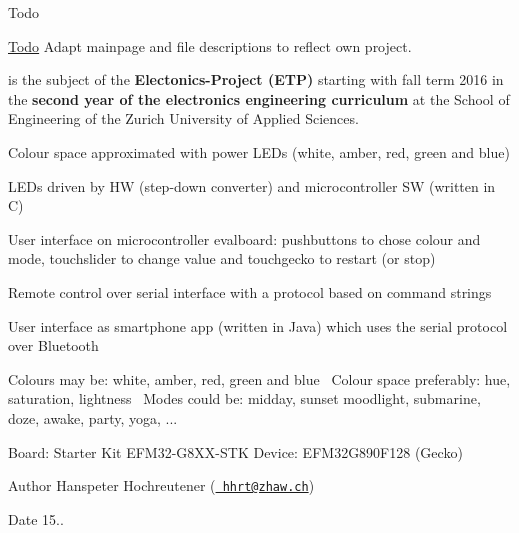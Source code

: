 

\begin{DoxyRefDesc}{Todo}
\item[\mbox{\hyperlink{todo__todo000001}{Todo}}]Adapt mainpage and file descriptions to reflect own project.\end{DoxyRefDesc}


is the subject of the {\bfseries{Electonics-\/\+Project (E\+TP)}} starting with fall term 2016 in the {\bfseries{second year of the electronics engineering curriculum}} at the School of Engineering of the Zurich University of Applied Sciences.

Colour space approximated with power L\+E\+Ds (white, amber, red, green and blue) 

L\+E\+Ds driven by HW (step-\/down converter) and microcontroller SW (written in C) 

User interface on microcontroller evalboard\+: pushbuttons to chose colour and mode, touchslider to change value and touchgecko to restart (or stop) 

Remote control over serial interface with a protocol based on command strings 

User interface as smartphone app (written in Java) which uses the serial protocol over Bluetooth 

Colours may be\+: white, amber, red, green and blue~\newline
 Colour space preferably\+: hue, saturation, lightness~\newline
 Modes could be\+: midday, sunset moodlight, submarine, doze, awake, party, yoga, ...

Board\+: Starter Kit E\+F\+M32-\/\+G8\+X\+X-\/\+S\+TK Device\+: E\+F\+M32\+G890\+F128 (Gecko)

\begin{DoxyAuthor}{Author}
Hanspeter Hochreutener (\href{mailto:hhrt@zhaw.ch}{\texttt{ hhrt@zhaw.\+ch}}) 
\end{DoxyAuthor}
\begin{DoxyDate}{Date}
15.. 
\end{DoxyDate}
